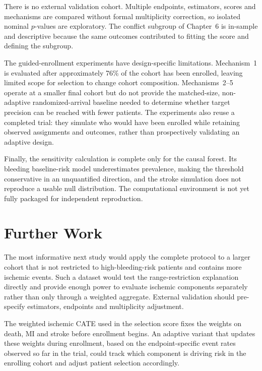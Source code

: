 There is no external validation cohort. Multiple endpoints, estimators, scores and
mechanisms are compared without formal multiplicity correction, so isolated nominal
$p$-values are exploratory. The conflict subgroup of Chapter~6 is in-sample and
descriptive because the same outcomes contributed to fitting the score and defining the
subgroup.

\vspace{10pt}

The guided-enrollment experiments have design-specific limitations. Mechanism~1 is
evaluated after approximately 76\% of the cohort has been enrolled, leaving limited scope
for selection to change cohort composition. Mechanisms~2--5 operate at a smaller final
cohort but do not provide the matched-size, non-adaptive randomized-arrival baseline
needed to determine whether target precision can be reached with fewer patients. The
experiments also reuse a completed trial: they simulate who would have been enrolled
while retaining observed assignments and outcomes, rather than prospectively validating
an adaptive design.

\vspace{10pt}

Finally, the sensitivity calculation is complete only for the causal forest. Its bleeding
baseline-risk model underestimates prevalence, making the threshold conservative in an
unquantified direction, and the stroke simulation does not reproduce a usable null
distribution. The computational environment is not yet fully packaged for independent
reproduction.

\section{Further Work}

The most informative next study would apply the complete protocol to a larger cohort that
is not restricted to high-bleeding-risk patients and contains more ischemic events. Such
a dataset would test the range-restriction explanation directly and provide enough power
to evaluate ischemic components separately rather than only through a weighted aggregate.
External validation should pre-specify estimators, endpoints and multiplicity adjustment.

\vspace{10pt}
The weighted ischemic CATE used in the selection score fixes the weights on death, MI and
stroke before enrollment begins. An adaptive variant that updates these weights during
enrollment, based on the endpoint-specific event rates observed so far in the trial, could
track which component is driving risk in the enrolling cohort and adjust patient selection
accordingly.
\vspace{10pt}

